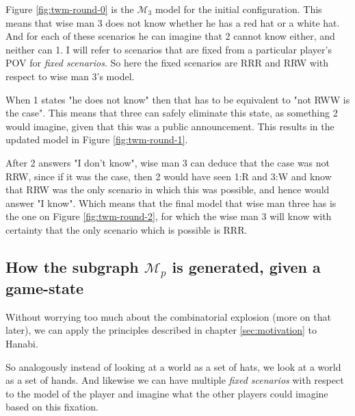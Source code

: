 Figure \ref{fig:twm-round-0} is the $\mathcal{M}_{3}$ model for the initial configuration. This means that wise man 3 does not know whether he has a red hat or a white hat. And for each of these scenarios he can imagine that 2 cannot know either, and neither can 1. I will refer to scenarios that are fixed from a particular player's POV for \emph{fixed scenarios}. So here the fixed scenarios are RRR and RRW with respect to wise man 3's model.

When 1 states "he does not know" then that has to be equivalent to "not RWW is the case". This means that three can safely eliminate this state, as something 2 would imagine, given that this was a public announcement. This results in the updated model in Figure \ref{fig:twm-round-1}.

After 2 answers "I don't know", wise man 3 can deduce that the case was not RRW, since if it was the case, then 2 would have seen 1:R and 3:W and know that RRW was the only scenario in which this was possible, and hence would answer "I know". Which means that the final model that wise man three has is the one on Figure \ref{fig:twm-round-2}, for which the wise man 3 will know with certainty that the only scenario which is possible is RRR.



\subsection{How the subgraph $\mathcal{M}_p$ is generated, given a game-state} \label{sec:description-of-how-modal-logic-is_applied}
Without worrying too much about the combinatorial explosion (more on that later), we can apply the principles described in chapter \ref{sec:motivation} to Hanabi. 

So analogously instead of looking at a world as a set of hats, we look at a world as a set of hands. And likewise we can have multiple \emph{fixed scenarios} with respect to the model of the player and imagine what the other players could imagine based on this fixation. 

